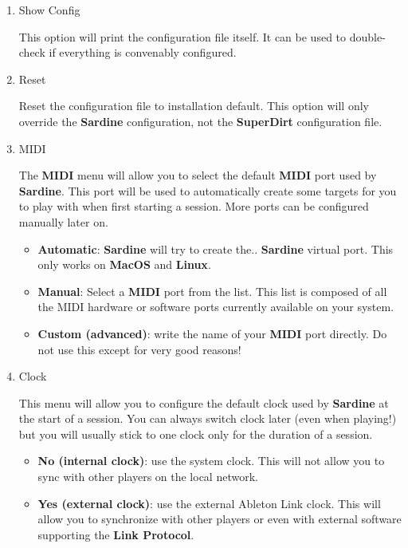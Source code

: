 \documentclass[11pt]{article}
\begin{document}
\begin{enumerate}
\item Show Config
\label{sec:org3c42e42}

This option will print the configuration file itself. It can be used to double-check if everything is convenably configured.

\item Reset
\label{sec:orgacd9c91}

Reset the configuration file to installation default. This option will only override the \textbf{Sardine} configuration, not the \textbf{SuperDirt} configuration file.

\item MIDI
\label{sec:org65c1223}

The \textbf{MIDI} menu will allow you to select the default \textbf{MIDI} port used by \textbf{Sardine}. This port will be used to automatically create some targets for you to play with when first starting a session. More ports can be configured manually later on.

\begin{itemize}
\item \textbf{Automatic}: \textbf{Sardine} will try to create the.. \textbf{Sardine} virtual port. This only works on \textbf{MacOS} and \textbf{Linux}.
\item \textbf{Manual}: Select a \textbf{MIDI} port from the list. This list is composed of all the MIDI hardware or software ports currently available on your system.
\item \textbf{Custom (advanced)}: write the name of your \textbf{MIDI} port directly. Do not use this except for very good reasons!
\end{itemize}

\item Clock
\label{sec:org5454e73}

This menu will allow you to configure the default clock used by \textbf{Sardine} at the start of a session. You can always switch clock later (even when playing!) but you will usually stick to one clock only for the duration of a session.

\begin{itemize}
\item \textbf{No (internal clock)}: use the system clock. This will not allow you to sync with other players on the local network.
\item \textbf{Yes (external clock)}: use the external Ableton Link clock. This will allow you to synchronize with other players or even with external software supporting the \textbf{Link Protocol}.
\end{itemize}


\end{enumerate}
\end{document}
